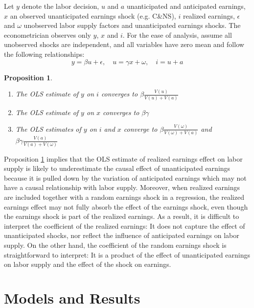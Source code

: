 \documentclass[reviewmode,AEJ]{AEA}
\newtheorem{proposition}{Proposition}
\begin{document}
Let $y$ denote the labor decision, $u$ and $a$ unanticipated and anticipated earnings, $x$ an observed
unanticipated earnings shock (e.g. C\&NS), $i$ realized earnings, $\epsilon$ and $\omega$ unobserved labor
supply factors and unanticipated earnings shocks. The econometrician observes only $y$, $x$ and $i$.
For the ease of analysis, assume all unobserved shocks are independent, and all variables have zero mean 
and follow the following relationships:
\begin{equation*}
    y = \beta u + \epsilon, \quad u = \gamma x + \omega, \quad i = u + a
\end{equation*}
\begin{proposition}
\label{prop:ols1}
\begin{enumerate}
\item[(a)] The OLS estimate of $y$ on $i$ converges to $\beta\frac{V(u)}{V(u) + V(a)}$
\item[(b)] The OLS estimate of $y$ on $x$ converges to $\beta\gamma$
\item[(c)] The OLS estimates of $y$ on $i$ and $x$ converge to $\beta\frac{V(\omega)}{V(\omega) + V(a)}$ and $\beta\gamma\frac{V(a)}{V(a)+V(\omega)}$
\end{enumerate}
\end{proposition}


Proposition \ref{prop:ols1} implies that the OLS estimate of realized earnings effect on labor supply is
likely to underestimate the causal effect of unanticipated earnings because it is pulled down by the variation 
of anticipated earnings which may not have a causal relationship with labor supply. Moreover, when realized
earnings are included together with a random earnings shock in a regression, the realized earnings effect may
not fully absorb the effect of the earnings shock, even though the earnings shock is part of the realized 
earnings. As a result, it is difficult to interpret the coefficient of the realized earnings: It does not 
capture the effect of unanticipated shocks, nor reflect the influence of anticipated earnings on labor supply.
On the other hand, the coefficient of the random earnings shock is straightforward to interpret: It is a
product of the effect of unanticipated earnings on labor supply and the effect of the shock on earnings.


\section{Models and Results}
\label{sec:main}
\end{document}
